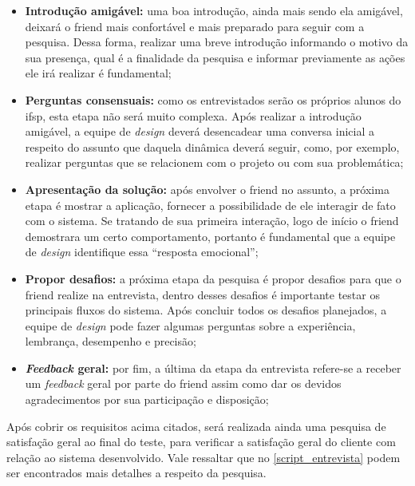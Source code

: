 \begin{itemize}
    \item \textbf{Introdução amigável:} uma boa introdução, ainda mais sendo ela amigável, deixará o \gls{friend} mais confortável e mais preparado para seguir com a pesquisa. Dessa forma, realizar uma breve introdução informando o motivo da sua presença, qual é a finalidade da pesquisa e informar previamente as ações ele irá realizar é fundamental;
    \item \textbf{Perguntas consensuais:} como os entrevistados serão os próprios alunos do \acs{ifsp}, esta etapa não será muito complexa. Após realizar a introdução amigável, a equipe de \textit{design} deverá desencadear uma conversa inicial a respeito do assunto que daquela dinâmica deverá seguir, como, por exemplo, realizar perguntas que se relacionem com o projeto ou com sua problemática; 
    \item \textbf{Apresentação da solução:} após envolver o \gls{friend} no assunto, a próxima etapa é mostrar a aplicação, fornecer a possibilidade de ele interagir de fato com o sistema. Se tratando de sua primeira interação, logo de início o \gls{friend} demostrara um certo comportamento, portanto é fundamental que a equipe de \textit{design} identifique essa ``resposta emocional'';
    \item \textbf{Propor desafios:} a próxima etapa da pesquisa é propor desafios para que o \gls{friend} realize na entrevista, dentro desses desafios é importante testar os principais fluxos do sistema. Após concluir todos os desafios planejados, a equipe de \textit{design} pode fazer algumas perguntas sobre a experiência, lembrança, desempenho e precisão; 
    \item \textbf{\textit{Feedback} geral:} por fim, a última da etapa da entrevista refere-se a receber um \textit{feedback} geral por parte do \gls{friend} assim como dar os devidos agradecimentos por sua participação e disposição;
\end{itemize}

Após cobrir os requisitos acima citados, será realizada ainda uma pesquisa de satisfação geral ao final do teste, para verificar a satisfação geral do cliente com relação ao sistema desenvolvido. Vale ressaltar que no \autoref{script_entrevista} podem ser encontrados mais detalhes a respeito da pesquisa.

